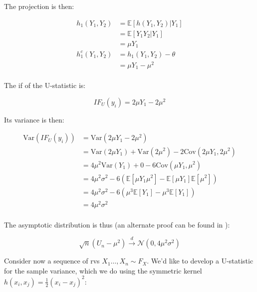 \documentclass{report}
\begin{document}
The projection is then:

\begin{equation}\label{eq:ex-lst-u-statistic-m2-projection}
    \begin{aligned}
      h_1(Y_1, Y_2)
        &= \mathbb{E}[h(Y_1, Y_2) | Y_1] \\
        &= \mathbb{E}[Y_1Y_2 | Y_1] \\
        &= \mu Y_1 \\
      h_1^c(Y_1, Y_2)
        &= h_1(Y_1, Y_2) - \theta \\
        &= \mu Y_1 - \mu^2 \\
    \end{aligned}
\end{equation}

The \gls{if} of the U-statistic is:

\begin{equation}\label{eq:ex-lst-u-statistic-m2-if}
    IF_U(y_i) = 2\mu Y_1 - 2\mu^2 
\end{equation}

Its variance is then:

\begin{equation}\label{eq:ex-lst-u-statistic-m2-if-variance}
    \begin{aligned}
      \text{Var}(IF_U(y_i))
        &= \text{Var}(2\mu Y_1 - 2\mu^2) \\
        &= \text{Var}(2\mu Y_1) + \text{Var}(2\mu^2) - 2\text{Cov}(2\mu Y_1, 2\mu^2) \\
        &= 4\mu^2 \text{Var}(Y_1) + 0 - 6\text{Cov}(\mu Y_1, \mu^2) \\
        &= 4\mu^2\sigma^2 - 6(\mathbb{E}[\mu Y_1 \mu^2] - \mathbb{E}[\mu Y_1]\mathbb{E}[\mu^2]) \\
        &= 4\mu^2\sigma^2 - 6(\mu^3\mathbb{E}[Y_1] - \mu^3\mathbb{E}[Y_1]) \\
        &= 4\mu^2\sigma^2 \\
    \end{aligned}
\end{equation}

The asymptotic distribution is thus (an alternate proof can be found in \cite[Chapter~5.5.2]{serfling_approximation_1980}):

\begin{equation}\label{eq:ex-lst-u-statistic-m2-asymptotics}
    \sqrt{n}(U_n - \mu^2) \overset{d}{\to} \mathcal{N}(0, 4\mu^2\sigma^2)
\end{equation}

Consider now a sequence of \glspl{rv} $X_1 \dots, X_n \sim F_X$. We'd like to develop a U-statistic for the sample variance, which we do using the symmetric kernel $h(x_i, x_j) = \frac{1}{2}(x_i - x_j)^2$:
\end{document}
